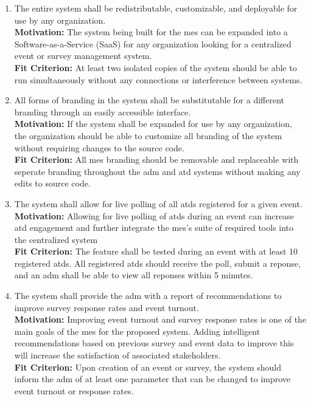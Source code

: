\documentclass[12pt]{article}
\begin{document}
\begin{enumerate}[align=left,
  leftmargin=*,
  labelsep=1em,
  itemindent=0em,
  label=\bfseries WR-\arabic*:,
  ref=\bfseries WR-\arabic*]
  \item \label{WR1} The entire system shall be redistributable, customizable, and deployable for use by any organization. \\[2mm]
    {\bf Motivation:} The system being built for the \gls{mes} can be expanded into a Software-as-a-Service (SaaS) for any organization looking for a centralized event or survey management system. \\
    {\bf Fit Criterion:} At least two isolated copies of the system should be able to run simultaneously without any connections or interference between systems.
  
  \item \label{WR2} All forms of branding in the system shall be substitutable for a different branding through an easily accessible interface.\\[2mm]
  {\bf Motivation:} If the system shall be expanded for use by any organization, the organization should be able to customize all branding of the system without requiring changes to the source code.\\
  {\bf Fit Criterion:} All \gls{mes} branding should be removable and replaceable with seperate branding throughout the \gls{adm} and \gls{atd} systems without making any edits to source code.

  \item \label{WR3} The system shall allow for live polling of all \glspl{atd} registered for a given event. \\[2mm]
  {\bf Motivation:} Allowing for live polling of \glspl{atd} during an event can increase \gls{atd} engagement and further integrate the \gls{mes}'s suite of required tools into the centralized system\\
  {\bf Fit Criterion:} The feature shall be tested during an event with at least 10 registered \glspl{atd}. All registered \glspl{atd} should receive the poll, submit a reponse, and an \gls{adm} shall be able to view all reponses within 5 minutes.

  \item \label{WR4} The system shall provide the \gls{adm} with a report of recommendations to improve survey response rates and event turnout.\\[2mm]
  {\bf Motivation:} Improving event turnout and survey response rates is one of the main goals of the \gls{mes} for the proposed system. Adding intelligent recommendations based on previous survey and event data to improve this will increase the satisfaction of associated stakeholders.\\
  {\bf Fit Criterion:} Upon creation of an event or survey, the system should inform the \gls{adm} of at least one parameter that can be changed to improve event turnout or response rates.


\end{enumerate}
\end{document}

